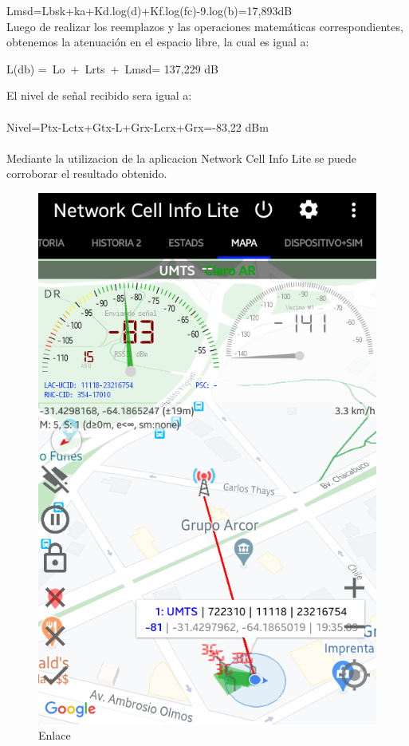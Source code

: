 \documentclass[conference, 9pt, a4paper]{IEEEtran}
\begin{document}
Lmsd=Lbsk+ka+Kd.log(d)+Kf.log(fc)-9.log(b)=17,893dB\\

Luego de realizar los reemplazos y las operaciones matemáticas correspondientes, obtenemos la atenuación en el espacio libre, la cual es igual a:\\
\begin{center}

L(db) =\ Lo\ +\ Lrts\ +\ Lmsd= 137,229 dB
\end{center}
El nivel de señal recibido sera igual a:\\
\\
Nivel=Ptx-Lctx+Gtx-L+Grx-Lcrx+Grx=-83,22 dBm\\
\\

Mediante la utilizacion de la aplicacion Network Cell Info Lite se puede corroborar el resultado obtenido.


\begin{figure}
	\centering
	\includegraphics[width=\columnwidth]{image/Screenshot_2020-06-26-19-35-34-1.png}
	\caption{ Enlace}
\end{figure}
\end{document}
